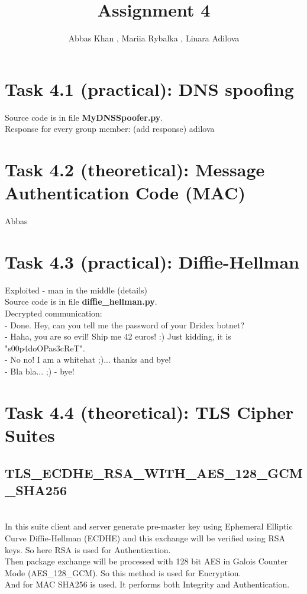 \documentclass{article}
\title{Assignment 4}
\author{Abbas Khan , Mariia Rybalka , Linara Adilova}
\begin{document}
\maketitle 
    
\section*{Task 4.1 (practical): DNS spoofing}
Source code is in file \textbf{MyDNSSpoofer.py}.
\\
Response for every group member:
(add response)
adilova

\section*{Task 4.2 (theoretical): Message Authentication Code (MAC)}
Abbas

\section*{Task 4.3 (practical): Diffie-Hellman}
Exploited - man in the middle (details)
\\
Source code is in file \textbf{diffie\_hellman.py}.
\\
Decrypted communication:
\\- Done. Hey, can you tell me the password of your Dridex botnet?
\\- Haha, you are so evil! Ship me 42 euros! :) Just kidding, it is "s00p4doOPas3cReT".
\\- No no! I am a whitehat ;)... thanks and bye!
\\- Bla bla... ;) - bye!

\section*{Task 4.4 (theoretical): TLS Cipher Suites}
\subsection*{TLS\_ECDHE\_RSA\_WITH\_AES\_128\_GCM\_SHA256}
\cite{tls-ref}
\\
In this suite client and server generate pre-master key using Ephemeral Elliptic Curve Diffie-Hellman (ECDHE) and this exchange will be verified using RSA keys. So here RSA is used for Authentication. 
\\
Then package exchange will be processed with 128 bit AES in Galois Counter Mode (AES\_128\_GCM). So this method is used for Encryption.
\\
And for MAC SHA256 is used. It performs both Integrity and Authentication.
\end{document}
